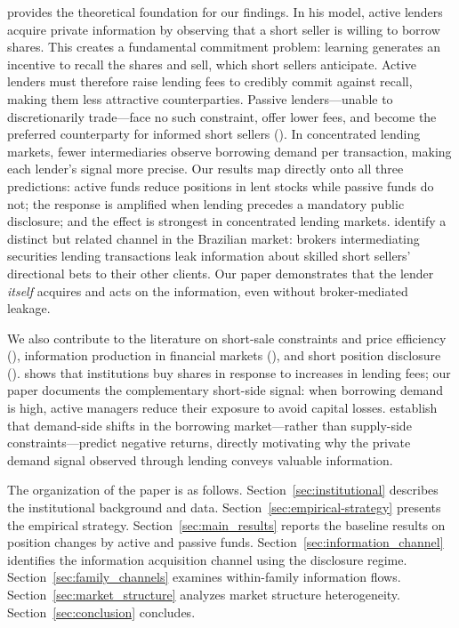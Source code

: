 \cite{Nurisso2026} provides the theoretical foundation for our findings.  In his model, active lenders acquire private information by observing that a short seller is willing to borrow shares.  This creates a fundamental commitment problem: learning generates an incentive to recall the shares and sell, which short sellers anticipate.  Active lenders must therefore raise lending fees to credibly commit against recall, making them less attractive counterparties.  Passive lenders---unable to discretionarily trade---face no such constraint, offer lower fees, and become the preferred counterparty for informed short sellers (\citealp{PaliaSokolinski2024}).  In concentrated lending markets, fewer intermediaries observe borrowing demand per transaction, making each lender's signal more precise.  Our results map directly onto all three predictions: active funds reduce positions in lent stocks while passive funds do not; the response is amplified when lending precedes a mandatory public disclosure; and the effect is strongest in concentrated lending markets.  \cite{ChagueGiovannettiHerskovic2025} identify a distinct but related channel in the Brazilian market: brokers intermediating securities lending transactions leak information about skilled short sellers' directional bets to their other clients.  Our paper demonstrates that the lender \emph{itself} acquires and acts on the information, even without broker-mediated leakage.

We also contribute to the literature on short-sale constraints and price efficiency (\citealp{saffi_sigurdsson:08, prado_saffi_sturgess:14}), information production in financial markets (\citealp{Goldstein_yang:2017, grossman_stiglitz:80}), and short position disclosure (\citealp{jank_roling_smajlbegovic2020, jones_reed_waller:16}).  \cite{prado_2015} shows that institutions buy shares in response to increases in lending fees; our paper documents the complementary short-side signal: when borrowing demand is high, active managers reduce their exposure to avoid capital losses.  \cite{cohen_diether_malloy:07} establish that demand-side shifts in the borrowing market---rather than supply-side constraints---predict negative returns, directly motivating why the private demand signal observed through lending conveys valuable information.

The organization of the paper is as follows.  Section~\ref{sec:institutional} describes the institutional background and data.  Section~\ref{sec:empirical-strategy} presents the empirical strategy.  Section~\ref{sec:main_results} reports the baseline results on position changes by active and passive funds.  Section~\ref{sec:information_channel} identifies the information acquisition channel using the disclosure regime.  Section~\ref{sec:family_channels} examines within-family information flows.  Section~\ref{sec:market_structure} analyzes market structure heterogeneity.  Section~\ref{sec:conclusion} concludes.
